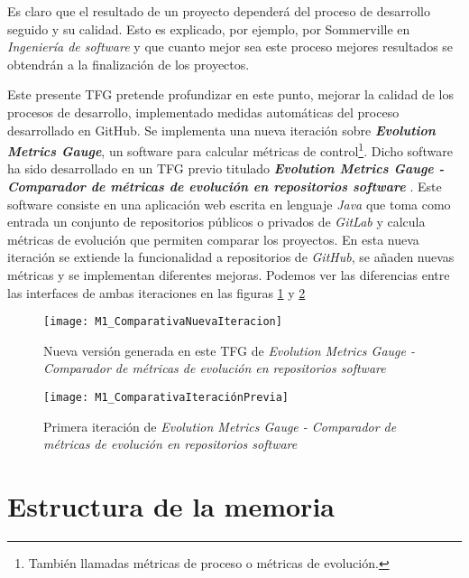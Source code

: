 Es claro que el resultado de un proyecto dependerá del proceso de desarrollo seguido y su calidad. Esto es explicado, por ejemplo, por Sommerville en \textit{Ingeniería de software} \cite{sommerville_ingenierisoftware_2002} y que cuanto mejor sea este proceso mejores resultados se obtendrán a la finalización de los proyectos.

Este presente TFG pretende profundizar en este punto, mejorar la calidad de los procesos de desarrollo,  implementado medidas automáticas del proceso desarrollado en GitHub. Se implementa una nueva iteración sobre \textit{\textbf{Evolution Metrics Gauge}}, un software para calcular métricas de control\footnote{También llamadas métricas de proceso o métricas de evolución.}.
Dicho software ha sido desarrollado en un TFG previo titulado \textit{\textbf{Evolution Metrics Gauge - Comparador de métricas de evolución en repositorios software}} \cite{TFGPrevio}. Este software consiste en una aplicación web escrita en lenguaje \textit{Java} que toma como entrada un conjunto de repositorios públicos o privados de \textit{GitLab} y calcula métricas de evolución que permiten comparar los proyectos.
En esta nueva iteración se extiende la funcionalidad a repositorios de \textit{GitHub}, se añaden nuevas métricas y se implementan diferentes mejoras. Podemos ver las diferencias entre las interfaces de ambas iteraciones en las figuras \ref{fig:M1_ComparativaNuevaIteracion} y \ref{fig:M1_ComparativaIteraciónPrevia}

\begin{figure}[!h]
	\centering
	\texttt{[image: M1\_ComparativaNuevaIteracion]}
	\caption{Nueva versión generada en este TFG de \textit{Evolution Metrics Gauge - Comparador de métricas de evolución en repositorios software}}\label{fig:M1_ComparativaNuevaIteracion}
\end{figure}
\FloatBarrier


\begin{figure}[!h]
	\centering
	\texttt{[image: M1\_ComparativaIteraciónPrevia]}
	\caption{Primera iteración de \textit{Evolution Metrics Gauge - Comparador de métricas de evolución en repositorios software}}\label{fig:M1_ComparativaIteraciónPrevia}
\end{figure}
\FloatBarrier

\newpage
\section{Estructura de la memoria}

